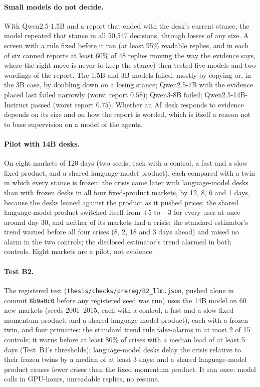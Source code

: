 \paragraph{Small models do not decide.} With Qwen2.5-1.5B and a report that ended with the desk's current stance, the model repeated that stance in all 50{,}547 decisions, through losses of any size. A screen with a rule fixed before it ran (at least 95\% readable replies, and in each of six canned reports at least 60\% of 48 replies moving the way the evidence says, where the right move is never to keep the stance) then tested five models and two wordings of the report. The 1.5B and 3B models failed, mostly by copying or, in the 3B case, by doubling down on a losing stance; Qwen2.5-7B with the evidence placed last failed narrowly (worst report $0.58$); Qwen3-8B failed; Qwen2.5-14B-Instruct passed (worst report $0.75$). Whether an AI desk responds to evidence depends on its size and on how the report is worded, which is itself a reason not to base supervision on a model of the agents.

\paragraph{Pilot with 14B desks.} On eight markets of 120 days (two seeds, each with a control, a fast and a slow fixed product, and a shared language-model product), each compared with a twin in which every stance is frozen: the crisis came later with language-model desks than with frozen desks in all four fixed-product markets, by 12, 8, 6 and 1 days, because the desks leaned against the product as it pushed prices; the shared language-model product switched itself from $+5$ to $-3$ for every user at once around day 30, and neither of its markets had a crisis; the standard estimator's trend warned before all four crises (8, 2, 18 and 3 days ahead) and raised no alarm in the two controls; the disclosed estimator's trend alarmed in both controls. Eight markets are a pilot, not evidence.

\paragraph{Test B2.} The registered test (\nolinkurl{thesis/checks/prereg/B2_llm.json}, pushed alone in commit \texttt{8b9a0c0} before any registered seed was run) uses the 14B model on 60 new markets (seeds 2001--2015, each with a control, a fast and a slow fixed momentum product, and a shared language-model product), each with a frozen twin, and four primaries: the standard trend rule false-alarms in at most 2 of 15 controls; it warns before at least 80\% of crises with a median lead of at least 5 days (Test~B1's thresholds); language-model desks delay the crisis relative to their frozen twins by a median of at least 3 days; and a shared language-model product causes fewer crises than the fixed momentum product. It ran once: \BtwoCalls{} model calls in \BtwoHours{} GPU-hours, \BtwoParseFail{} unreadable replies, no resume.

